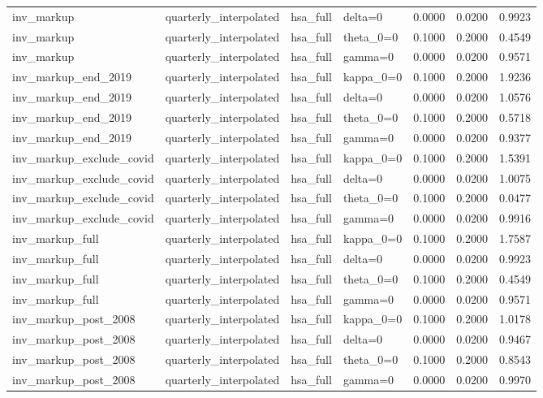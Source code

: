 \begin{tabular}{llllrrr}
inv\_markup & quarterly\_interpolated & hsa\_full & delta=0 & 0.0000 & 0.0200 & 0.9923 \\
inv\_markup & quarterly\_interpolated & hsa\_full & theta\_0=0 & 0.1000 & 0.2000 & 0.4549 \\
inv\_markup & quarterly\_interpolated & hsa\_full & gamma=0 & 0.0000 & 0.0200 & 0.9571 \\
inv\_markup\_end\_2019 & quarterly\_interpolated & hsa\_full & kappa\_0=0 & 0.1000 & 0.2000 & 1.9236 \\
inv\_markup\_end\_2019 & quarterly\_interpolated & hsa\_full & delta=0 & 0.0000 & 0.0200 & 1.0576 \\
inv\_markup\_end\_2019 & quarterly\_interpolated & hsa\_full & theta\_0=0 & 0.1000 & 0.2000 & 0.5718 \\
inv\_markup\_end\_2019 & quarterly\_interpolated & hsa\_full & gamma=0 & 0.0000 & 0.0200 & 0.9377 \\
inv\_markup\_exclude\_covid & quarterly\_interpolated & hsa\_full & kappa\_0=0 & 0.1000 & 0.2000 & 1.5391 \\
inv\_markup\_exclude\_covid & quarterly\_interpolated & hsa\_full & delta=0 & 0.0000 & 0.0200 & 1.0075 \\
inv\_markup\_exclude\_covid & quarterly\_interpolated & hsa\_full & theta\_0=0 & 0.1000 & 0.2000 & 0.0477 \\
inv\_markup\_exclude\_covid & quarterly\_interpolated & hsa\_full & gamma=0 & 0.0000 & 0.0200 & 0.9916 \\
inv\_markup\_full & quarterly\_interpolated & hsa\_full & kappa\_0=0 & 0.1000 & 0.2000 & 1.7587 \\
inv\_markup\_full & quarterly\_interpolated & hsa\_full & delta=0 & 0.0000 & 0.0200 & 0.9923 \\
inv\_markup\_full & quarterly\_interpolated & hsa\_full & theta\_0=0 & 0.1000 & 0.2000 & 0.4549 \\
inv\_markup\_full & quarterly\_interpolated & hsa\_full & gamma=0 & 0.0000 & 0.0200 & 0.9571 \\
inv\_markup\_post\_2008 & quarterly\_interpolated & hsa\_full & kappa\_0=0 & 0.1000 & 0.2000 & 1.0178 \\
inv\_markup\_post\_2008 & quarterly\_interpolated & hsa\_full & delta=0 & 0.0000 & 0.0200 & 0.9467 \\
inv\_markup\_post\_2008 & quarterly\_interpolated & hsa\_full & theta\_0=0 & 0.1000 & 0.2000 & 0.8543 \\
inv\_markup\_post\_2008 & quarterly\_interpolated & hsa\_full & gamma=0 & 0.0000 & 0.0200 & 0.9970 \\

\end{tabular}

